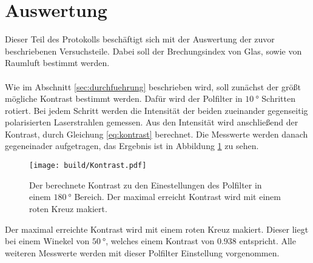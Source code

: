 \newpage
\section{Auswertung}
\label{sec:auswertung}

Dieser Teil des Protokolls beschäftigt sich mit der Auswertung der zuvor beschriebenen Versuchsteile.
Dabei soll der Brechungsindex von Glas, sowie von Raumluft bestimmt werden.\\\\
Wie im Abschnitt \ref{sec:durchfuehrung} beschrieben wird, soll zunächst der größt mögliche Kontrast bestimmt werden.
Dafür wird der Polfilter in $\SI{10}{\degree}$ Schritten rotiert.
Bei jedem Schritt werden die Intensität der beiden zueinander gegenseitig polarisierten Laserstrahlen gemessen.
Aus den Intensität wird anschließend der Kontrast, durch Gleichung \eqref{eq:kontrast} berechnet.
Die Messwerte werden danach gegeneinader aufgetragen, das Ergebnis ist in Abbildung \ref{fig:Kontrast} zu sehen.
\begin{figure}
    \centering
    \texttt{[image: build/Kontrast.pdf]}
    \caption{Der berechnete Kontrast zu den Einestellungen des Polfilter in einem $\SI{180}{\degree}$ Bereich.
    Der maximal erreicht Kontrast wird mit einem roten Kreuz makiert.}
    \label{fig:Kontrast}
\end{figure}
Der maximal erreichte Kontrast wird mit einem roten Kreuz makiert.
Dieser liegt bei einem Winekel von $\SI{50}{\degree}$, welches einem Kontrast von $0.938$ entspricht.
Alle weiteren Messwerte werden mit dieser Polfilter Einstellung vorgenommen.
